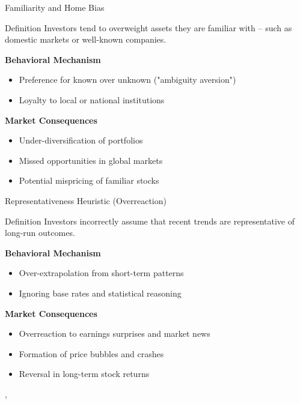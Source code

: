 \begin{frame}{Familiarity and Home Bias}
	
	\begin{block}{Definition}  
		Investors tend to overweight assets they are familiar with -- such as domestic markets or well-known companies.
	\end{block}
	
	
	\vspace{0.3cm}
	\textbf{Behavioral Mechanism}
	\begin{itemize}
		\item Preference for known over unknown ("ambiguity aversion")
		\item Loyalty to local or national institutions
	\end{itemize}
	
	\vspace{0.3cm}
	\textbf{Market Consequences}
	\begin{itemize}
		\item Under-diversification of portfolios
		\item Missed opportunities in global markets
		\item Potential mispricing of familiar stocks
	\end{itemize}
	
	\vspace{0.2cm}
	\tiny{\textcite{huberman2001familiarity}}
\end{frame}

\begin{frame}{Representativeness Heuristic (Overreaction)}
	\begin{block}{Definition}  
		Investors incorrectly assume that recent trends are representative of long-run outcomes.
	\end{block}
	
	
	\vspace{0.3cm}
	\textbf{Behavioral Mechanism}
	\begin{itemize}
		\item Over-extrapolation from short-term patterns
		\item Ignoring base rates and statistical reasoning
	\end{itemize}
	
	\vspace{0.3cm}
	\textbf{Market Consequences}
	\begin{itemize}
		\item Overreaction to earnings surprises and market news
		\item Formation of price bubbles and crashes
		\item Reversal in long-term stock returns
	\end{itemize}
	
	\vspace{0.2cm}
	\tiny{\textcite{kahneman1972subjective}, \textcite{barberis1998model}}
\end{frame}


